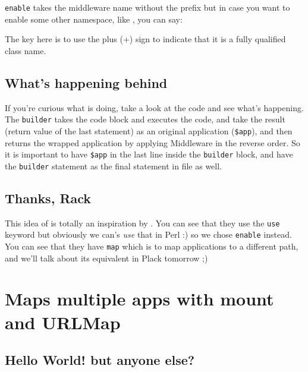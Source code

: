 \lstinline!enable! takes the middleware name without the
 prefix but in case you want to enable some other
namespace, like , you can say:


The key here is to use the plus (+) sign to indicate that it is a fully
qualified class name.

\section{What's happening behind}\label{whats-happening-behind}

If you're curious what  is doing, take a look at the code
and see what's happening. The \lstinline!builder! takes the code block
and executes the code, and take the result (return value of the last
statement) as an original application (\lstinline!$app!), and then
returns the wrapped application by applying Middleware in the reverse
order. So it is important to have \lstinline!$app! in the last line
inside the \lstinline!builder! block, and have the \lstinline!builder!
statement as the final statement in  file as well.

\section{Thanks, Rack}\label{thanks-rack}

This idea of  is totally an inspiration by
\href{http://m.onkey.org/2008/11/18/ruby-on-rack-2-rack-builder}{}.
You can see that they use the \lstinline!use! keyword but obviously we
can's \emph{use} that in Perl :) so we chose \lstinline!enable! instead.
You can see that they have \lstinline!map! which is to map applications
to a different path, and we'll talk about its equivalent in Plack
tomorrow ;)

\chapter{Maps multiple apps with mount and
URLMap}\label{day-12-maps-multiple-apps-with-mount-and-urlmap}

\section{Hello World! but anyone
else?}\label{hello-world-but-anyone-else}

